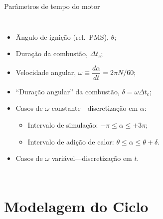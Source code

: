     \begin{frame}{Parâmetros de tempo do motor}\vspace*{-2em}
        \begin{columns}
        \begin{itemize}
            \item<1-> \alert{Ângulo} de ignição (rel.~PMS), \alert{$\theta$};
            \item<2-> \alert{Duração} da combustão, \alert{$\Delta t_c$};
            \item<3-> \alert{Velocidade angular}, \alert{$\omega \equiv \dfrac{d\alpha}{dt} =
                2\pi N/60$};
            \item<4-> ``\alert{Duração angular}'' da combustão, \alert{$\delta = \omega\Delta t_c$};
                \\[\medskipamount]
            \item<5-> Casos de \alert{$\omega$ constante}---discretização em $\alpha$:
            \begin{itemize}
                \item<5-> Intervalo de simulação: \alert{$-\pi \leqslant \alpha \leqslant +3\pi$};
                \item<6-> Intervalo de adição de calor: \alert{$\theta \leqslant \alpha \leqslant
                    \theta+\delta$}.\\[\medskipamount]
            \end{itemize}
            \item<7-> Casos de \alert{$\omega$ variável}---discretização em $t$.
        \end{itemize}
        \begin{center}
        \end{center}
        \end{columns}
    \end{frame}

\section{Modelagem do Ciclo}

